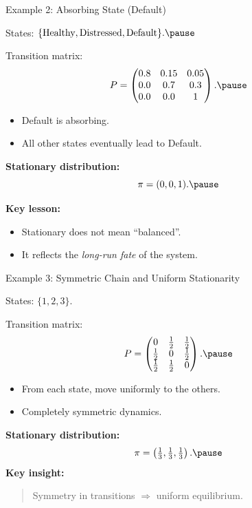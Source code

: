 \documentclass[aspectratio=169]{beamer}
\begin{document}
\begin{frame}{Example 2: Absorbing State (Default)}

States:
$
\{\text{Healthy},\text{Distressed},\text{Default}\}.\pause
$

Transition matrix:
\[
P=
\begin{pmatrix}
0.8 & 0.15 & 0.05\\
0.0 & 0.7 & 0.3\\
0.0 & 0.0 & 1
\end{pmatrix}.
\vspace{-5mm}\pause
\]

\begin{itemize}
  \item Default is absorbing.\pause
  \item All other states eventually lead to Default.\pause
\end{itemize}

\medskip
\textbf{Stationary distribution:}
\[
\pi=(0,0,1).\pause
\vspace{-5mm}
\]


\textbf{Key lesson:}
\begin{itemize}
  \item Stationary does not mean “balanced”.\pause
  \item It reflects the \emph{long-run fate} of the system.
\end{itemize}

\end{frame}


\begin{frame}{Example 3: Symmetric Chain and Uniform Stationarity}

States:
$
\{1,2,3\}.
$\pause

Transition matrix:
\[
P=
\begin{pmatrix}
0 & \tfrac12 & \tfrac12\\
\tfrac12 & 0 & \tfrac12\\
\tfrac12 & \tfrac12 & 0
\end{pmatrix}.\pause
\]

\begin{itemize}
  \item From each state, move uniformly to the others.\pause
  \item Completely symmetric dynamics.
\end{itemize}

\textbf{Stationary distribution:}
\[
\pi=\left(\tfrac13,\tfrac13,\tfrac13\right).\pause
\]
\textbf{Key insight:}
\begin{quote}
Symmetry in transitions $\Rightarrow$ uniform equilibrium.\pause
\end{quote}

\end{frame}
\end{document}
